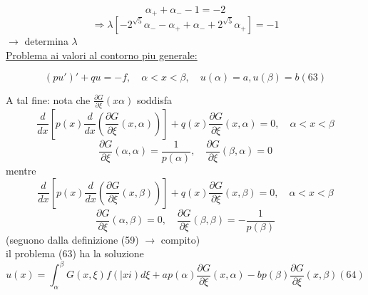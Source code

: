 \documentclass[a4paper,11pt]{report}
\begin{document}
$$
\alpha_+ + \alpha_- -1=-2
$$
$$
\Rightarrow \lambda\left[ -2^{\sqrt{5}}\alpha_- - \alpha_+ + \alpha_- + 2^{\sqrt{5}}\alpha_+\right]=-1
$$
$\rightarrow$ determina $\lambda$\\ %
\underline{Problema ai valori al contorno piu generale:}

\begin{equation}
(pu')'+qu=-f,\quad \alpha<x<\beta, \quad u(\alpha)=a, u(\beta)=b (63)
\end{equation}

A tal fine: nota che $\frac{\partial G}{\partial \xi}(x\alpha)$ soddisfa
$$
\dfrac{d}{dx}\left[p(x)\dfrac{d}{dx}\left(\dfrac{\partial G}{\partial \xi}(x,\alpha)\right)\right]+q(x)\dfrac{\partial G}{\partial \xi}(x,\alpha)=0, \quad \alpha<x<\beta
$$
$$
\dfrac{\partial G}{\partial \xi}(\alpha,\alpha)=\dfrac{1}{p(\alpha)}, \quad \dfrac{\partial G}{\partial \xi}(\beta,\alpha)=0
$$
mentre
$$
\dfrac{d}{dx}\left[p(x)\dfrac{d}{dx}\left(\dfrac{\partial G}{\partial \xi}(x,\beta)\right)\right]+q(x)\dfrac{\partial G}{\partial \xi}(x,\beta)=0, \quad \alpha<x<\beta
$$
$$
\dfrac{\partial G}{\partial \xi}(\alpha,\beta)=0, \quad \dfrac{\partial G}{\partial \xi}(\beta,\beta)=-\dfrac{1}{p(\beta)}
$$
(seguono dalla definizione (59) $\rightarrow$ compito)\\
il problema (63) ha la soluzione
\begin{equation}
u(x)=\int_\alpha^\beta G(x,\xi)f(|xi)d\xi + ap(\alpha)\dfrac{\partial G}{\partial \xi}(x,\alpha)-bp(\beta)\dfrac{\partial G}{\partial \xi}(x,\beta) (64)
\end{equation}
\end{document}
